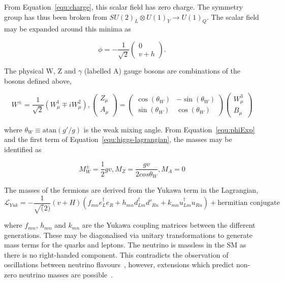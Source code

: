 From Equation~\ref{equ:charge}, this scalar field has zero charge. The symmetry group has thus been broken from
$SU(2)_L\otimes U(1)_Y \rightarrow U(1)_Q$. The scalar field may be expanded around this minima as

\begin{equation}
\label{equ:phiExp}
\phi =  - \frac{1}{\sqrt{2}}\begin{pmatrix} 0 \\ v + h\end{pmatrix}.
\end{equation}

The physical W, Z and $\gamma$ (labelled A) gauge bosons are combinations of the 
bosons defined above,

\begin{equation}
W^{\pm} = \frac{1}{\sqrt{2}} (W^1_\mu \mp i W^2_\mu), \begin{pmatrix} Z_\mu \\ A_\mu\end{pmatrix} = \begin{pmatrix} \cos(\theta_W) & -\sin(\theta_W) \\ \sin(\theta_W) & \cos(\theta_W)\end{pmatrix} \begin{pmatrix} W^3_\mu \\ B_\mu\end{pmatrix}
\end{equation}

where $\theta_W \equiv \text{atan}(g'/g)$ is the weak mixing angle. From Equation~\ref{equ:phiExp} and
the first term of Equation~\ref{equ:higgs-lagrangian}, the masses may be identified as

\begin{equation}
M_W^\pm = \frac{1}{2}gv, M_Z = \frac{gv}{2cos\theta_W}, M_A = 0
\end{equation}

The masses of the fermions are derived from the Yukawa term in the Lagrangian, 
\begin{equation}
\mathcal{L}_{Yuk} = - \frac{1}{\sqrt(2)}(v + H)(f_{mn} e_L^{\dagger}e_R + h_{mn} d_{Lm}^{\dagger}d'_{Rn} + k_{mn} u_{Lm}^{\dagger}u_{Rn}) + \text{hermitian conjugate}
\end{equation}

where $f_{mn}$, $h_{mn}$ and $k_{mn}$ are the Yukawa coupling matrices between the different generations. These may be diagonalised via unitary transformations
to generate mass terms for the quarks and leptons. The neutrino is massless in the SM as there is no right-handed component.
This contradicts the observation of oscillations between neutrino flavours~\cite{neutOsc},
however, extensions which predict non-zero neutrino masses are possible~\cite{neutM}. 

